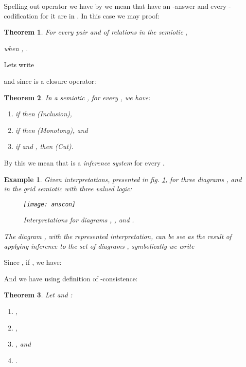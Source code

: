 \documentclass[oribibl]{llncs}
\newtheorem{thm}{Theorem}
\newtheorem{exam}{Example}
\begin{document}
Spelling out operator  we have
  by
 we mean that  have an -answer and
every -codification for it are in . In this case we may
proof:

\begin{thm}
For every pair  and  of relations in the semiotic ,

when , .
\end{thm}

Lets write

and since  is a closure operator:
\begin{thm} In a semiotic , for every , we have:
    \begin{enumerate}
        \item if  then (Inclusion),
        \item if  then  (Monotony), and
        \item if  and , then  (Cut).
    \end{enumerate}
\end{thm}

By this we mean that  is a
\emph{inference system} \cite{abramsky92}  for every .

\begin{exam}
Given interpretations, presented in fig. \ref{grid4}, for three diagrams ,  and  in the grid semiotic with three valued logic:

\begin{figure}[h]
\begin{center}
\texttt{[image: anscon]}
\end{center}
\caption{Interpretations for diagrams , ,  and .}\label{grid4}
\end{figure}

The diagram , with the represented interpretation, can be see as the result of applying inference to the set of diagrams , symbolically we write

\end{exam}

Since , if
, we have:



And we have using definition of -consistence:

\begin{thm} Let  and :
\begin{enumerate}
  \item ,
  \item ,
  \item , and
  \item .
\end{enumerate}
\end{thm}
\end{document}
